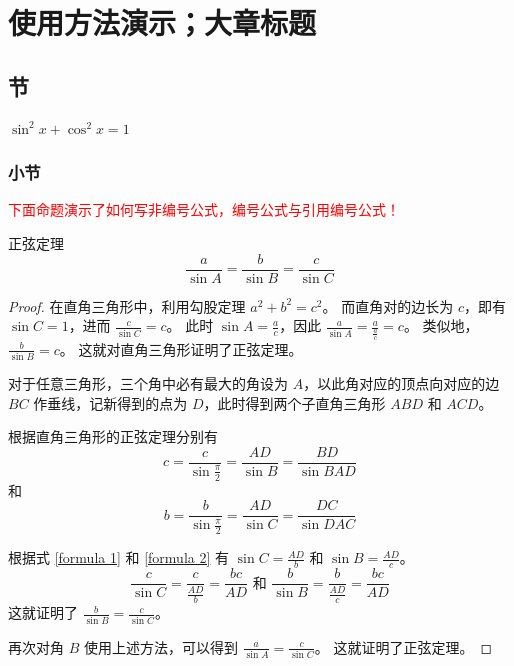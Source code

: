 \chapter{使用方法演示；大章标题}

\section{节}

\begin{axiom}
    $\sin^2 x + \cos^2 x = 1$
\end{axiom}

\subsection{小节}

\textcolor{red}{下面命题演示了如何写非编号公式，编号公式与引用编号公式！}
\begin{proposition} 正弦定理
    \[
        \frac{a}{\sin A} = \frac{b}{\sin B} = \frac{c}{\sin C}
    \]

    \begin{proof}
        在直角三角形中，利用勾股定理 $a^2 + b^2 = c^2$。
        而直角对的边长为 $c$，即有 $\sin C = 1$，进而 $\frac{c}{\sin C} = c$。
        此时 $\sin A = \frac{a}{c}$，因此 $\frac{a}{\sin A} = \frac{a}{\frac{a}{c}} = c$。
        类似地，$\frac{b}{\sin B} = c$。
        这就对直角三角形证明了正弦定理。

        对于任意三角形，三个角中必有最大的角设为 $A$，以此角对应的顶点向对应的边 $BC$ 作垂线，记新得到的点为 $D$，此时得到两个子直角三角形 $ABD$ 和 $ACD$。
        
        根据直角三角形的正弦定理分别有
        \begin{equation}\label{formula 1}
            c = \frac{c}{\sin \frac{\pi}{2}} = \frac{AD}{\sin B} = \frac{BD}{\sin BAD}
        \end{equation}
        和
        \begin{equation}\label{formula 2}
            b = \frac{b}{\sin \frac{\pi}{2}} = \frac{AD}{\sin C} = \frac{DC}{\sin DAC}
        \end{equation}
        
        根据式 \ref{formula 1} 和 \ref{formula 2} 有 $\sin C = \frac{AD}{b}$ 和 $\sin B = \frac{AD}{c}$。
        \[
            \frac{c}{\sin C} = \frac{c}{\frac{AD}{b}} = \frac{bc}{AD}
            \text{ 和 }
            \frac{b}{\sin B} = \frac{b}{\frac{AD}{c}} = \frac{bc}{AD}
        \]
        这就证明了 $\frac{b}{\sin B} = \frac{c}{\sin C}$。

        再次对角 $B$ 使用上述方法，可以得到 $\frac{a}{\sin A} = \frac{c}{\sin C}$。
        这就证明了正弦定理。
    \end{proof}
\end{proposition}

